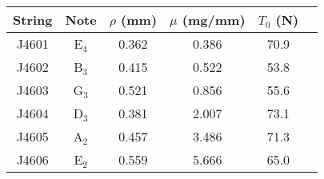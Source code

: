 \begin{tabular}{cccccc}
\toprule
String & Note & $\rho$ (mm) & $\mu$ (mg/mm) & $T_0$ (N) \\
\midrule
J4601 & E$_{4}$ & 0.362 & 0.386 & 70.9 \\
J4602 & B$_{3}$ & 0.415 & 0.522 & 53.8 \\
J4603 & G$_{3}$ & 0.521 & 0.856 & 55.6 \\
J4604 & D$_{3}$ & 0.381 & 2.007 & 73.1 \\
J4605 & A$_{2}$ & 0.457 & 3.486 & 71.3 \\
J4606 & E$_{2}$ & 0.559 & 5.666 & 65.0 \\
\bottomrule
\end{tabular}


